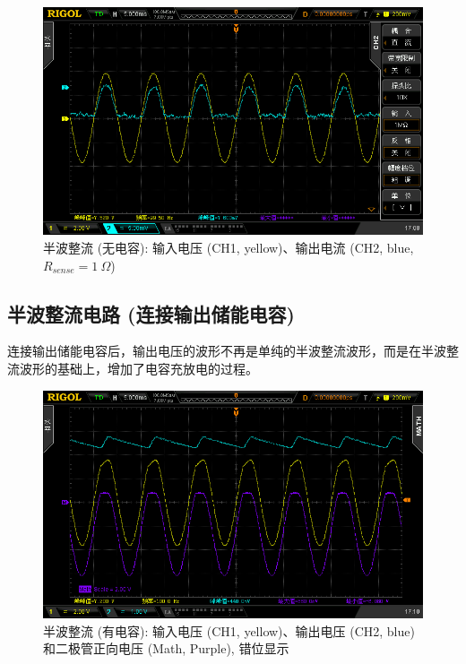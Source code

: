\documentclass[UTF8]{article}
\begin{document}
\begin{figure}[H]\centering
    \includegraphics[width=\columnwidth]{LCE-01-二极管/assets/二极管整流电路/半波整流-电流波形 二极管 无电容 输出解电阻.png}
    \caption{半波整流 (无电容): 输入电压 (CH1, yellow)、输出电流 (CH2, blue, $R_{sense} = 1\ \Omega$)}
\end{figure}



\subsection{半波整流电路 (连接输出储能电容)}

连接输出储能电容后，输出电压的波形不再是单纯的半波整流波形，而是在半波整流波形的基础上，增加了电容充放电的过程。

\begin{figure}[H]\centering
    \includegraphics[width=\columnwidth]{LCE-01-二极管/assets/二极管整流电路/半波整流-接电容 单二极管 有电容 输出接电阻.png}
    \caption{半波整流 (有电容): 输入电压 (CH1, yellow)、输出电压 (CH2, blue) 和二极管正向电压 (Math, Purple), 错位显示}
\end{figure}
\end{document}
